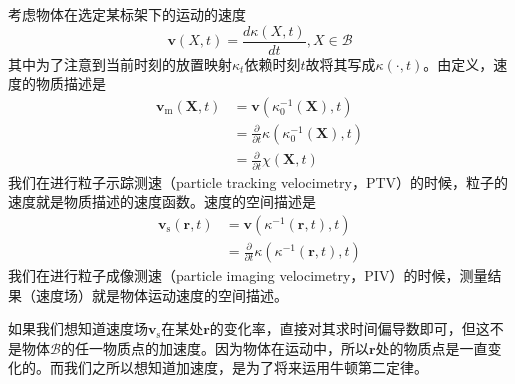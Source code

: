 \documentclass[main.tex]{subfiles}
\begin{document}
考虑物体在选定某标架下的运动的速度
\[\mathbf{v}\left(X,t\right)=\frac{d\kappa\left(X,t\right)}{dt},X\in\mathcal{B}\]
其中为了注意到当前时刻的放置映射$\kappa_t$依赖时刻$t$故将其写成$\kappa\left(\cdot,t\right)$。由定义，速度的物质描述是
\begin{align*}
\mathbf{v}_\mathrm{m}\left(\mathbf{X},t\right)&=\mathbf{v}\left(\kappa_0^{-1}\left(\mathbf{X}\right),t\right)\\
&=\frac{\partial}{\partial t}\kappa\left(\kappa_0^{-1}\left(\mathbf{X}\right),t\right)\\
&=\frac{\partial}{\partial t}\chi\left(\mathbf{X},t\right)
\end{align*}
我们在进行粒子示踪测速（particle tracking velocimetry，PTV）的时候，粒子的速度就是物质描述的速度函数。速度的空间描述是
\begin{align*}
\mathbf{v}_\mathrm{s}\left(\mathbf{r},t\right)&=\mathbf{v}\left(\kappa^{-1}\left(\mathbf{r},t\right),t\right)\\
&=\frac{\partial}{\partial t}\kappa\left(\kappa^{-1}\left(\mathbf{r},t\right),t\right)
\end{align*}
我们在进行粒子成像测速（particle imaging velocimetry，PIV）的时候，测量结果（速度场）就是物体运动速度的空间描述。

如果我们想知道速度场$\mathbf{v}_\mathrm{s}$在某处$\mathbf{r}$的变化率，直接对其求时间偏导数即可，但这不是物体$\mathcal{B}$的任一物质点的加速度。因为物体在运动中，所以$\mathbf{r}$处的物质点是一直变化的。而我们之所以想知道加速度，是为了将来运用牛顿第二定律。
\end{document}
